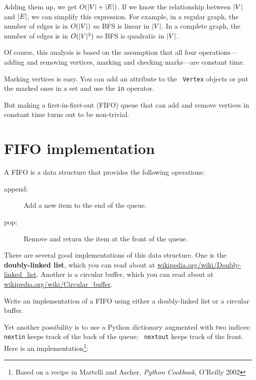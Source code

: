 \documentclass[10pt]{book}
\begin{document}
Adding them up, we get $O(|V| + |E|)$.  If we know the relationship
between $|V|$ and $|E|$, we can simplify this expression.  For
example, in a regular graph, the number of edges is in $O(|V|)$ so BFS
is linear in $|V|$.  In a complete graph, the number of edges is in
$O(|V|^2)$ so BFS is quadratic in $|V|$.

Of course, this analysis is based on the assumption that all four
operations---adding and removing vertices, marking and checking
marks---are constant time.

Marking vertices is easy.  You can add an attribute to the {\tt
  Vertex} objects or put the marked ones in a set and use
the {\tt in} operator.

But making a first-in-first-out (FIFO) queue that can add and remove
vertices in constant time turns out to be non-trivial.


\section{FIFO implementation}

A FIFO is a data structure that provides the following operations:

\begin{description}

\item[append:] Add a new item to the end of the queue.

\item[pop:] Remove and return the item at the front of the queue.

\end{description}

There are several good implementations of this data structure.
One is the {\bf doubly-linked list}, which 
you can read about at \url{wikipedia.org/wiki/Doubly-linked_list}.
Another is a circular buffer, which you can read about at
\url{wikipedia.org/wiki/Circular_buffer}.

\begin{ex}

Write an implementation of a FIFO using either a doubly-linked
list or a circular buffer.

\end{ex}

Yet another possibility is to use a Python dictionary augmented with
two indices: {\tt nextin} keeps track of the back of the queue; {\tt
  nextout} keeps track of the front.  Here is an
implementation\footnote{Based on a recipe in Martelli and Ascher, {\em
    Python Cookbook}, O'Reilly 2002}:
\end{document}
